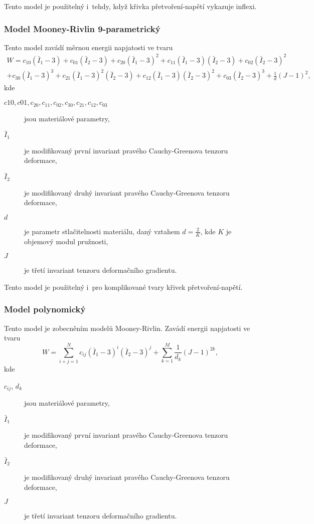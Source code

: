Tento model je použitelný i~tehdy, když křivka přetvoření-napětí vykazuje inflexi.

\subsubsection{Model Mooney-Rivlin 9-parametrický}
Tento model zavádí měrnou energii napjatosti ve tvaru
\begin{multline}
W
= c_{10} \left(\bar{I}_1 - 3\right)
+ c_{01} \left(\bar{I}_2 - 3\right)
+ c_{20} \left(\bar{I}_1 - 3\right)^2
+ c_{11} \left(\bar{I}_1 - 3\right) \left(\bar{I}_2 - 3\right)
+ c_{02} \left(\bar{I}_2 - 3\right)^2\\
+ c_{30} \left(\bar{I}_1 - 3\right)^3
+ c_{21} \left(\bar{I}_1 - 3\right)^2 \left(\bar{I}_2 - 3\right)
+ c_{12} \left(\bar{I}_1 - 3\right) \left(\bar{I}_2 - 3\right)^2
+ c_{03} \left(\bar{I}_2 - 3\right)^3
+ \frac{1}{d} \left(J - 1\right)^2,
\end{multline}
kde
\begin{description}
	\item[$c10, c01, c_{20}, c_{11}, c_{02}, c_{30}, c_{21}, c_{12}, c_{03}$] jsou materiálové parametry,
	\item[$\bar{I}_1$] je modifikovaný první invariant pravého Cauchy-Greenova tenzoru deformace,
	\item[$\bar{I}_2$] je modifikovaný druhý invariant pravého Cauchy-Greenova tenzoru deformace,
	\item[$d$] je parametr stlačitelnosti materiálu, daný vztahem $d = \frac{2}{K}$, kde $K$ je objemový modul pružnosti,
	\item[$J$] je třetí invariant tenzoru deformačního gradientu.
\end{description}

Tento model je použitelný i~pro komplikované tvary křivek přetvoření-napětí.

\subsubsection{Model polynomický}\label{sec:polynomicky-model}
Tento model je zobecněním modelů Mooney-Rivlin.
Zavádí energii napjatosti ve tvaru
\begin{equation}
W
= \sum\limits_{i+j=1}^N c_{ij} \left(\bar{I}_1 - 3\right)^i \left(\bar{I}_2 - 3\right)^j
+ \sum\limits_{k=1}^M \frac{1}{d_k} \left(J - 1\right)^{2k},
\end{equation}
kde
\begin{description}
	\item[$c_{ij}$, $d_k$] jsou materiálové parametry,
	\item[$\bar{I}_1$] je modifikovaný první invariant pravého Cauchy-Greenova tenzoru deformace,
	\item[$\bar{I}_2$] je modifikovaný druhý invariant pravého Cauchy-Greenova tenzoru deformace,
	\item[$J$] je třetí invariant tenzoru deformačního gradientu.
\end{description}

